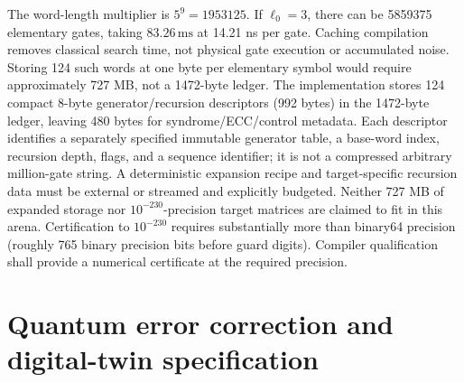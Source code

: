 \documentclass[11pt,a4paper]{article}
\newcommand{\unit}[1]{\,\mathrm{#1}}
\begin{document}
The word-length multiplier is $5^9=1953125$. If $\ell_0=3$, there can be 5859375 elementary
gates, taking $83.26\unit{ms}$ at 14.21 ns per gate. Caching compilation removes classical
search time, not physical gate execution or accumulated noise. Storing 124 such words at
one byte per elementary symbol would require approximately 727 MB, not a 1472-byte ledger.
The implementation stores 124 compact 8-byte generator/recursion descriptors
(992 bytes) in the 1472-byte ledger, leaving 480 bytes for syndrome/ECC/control metadata.
Each descriptor identifies a separately specified immutable generator table, a base-word
index, recursion depth, flags, and a sequence identifier; it is not a compressed arbitrary
million-gate string. A deterministic expansion recipe and target-specific recursion data
must be external or streamed and explicitly budgeted. Neither 727 MB of expanded storage
nor $10^{-230}$-precision target matrices are claimed to fit in this arena.
Certification to $10^{-230}$ requires substantially more than binary64 precision (roughly
765 binary precision bits before guard digits). Compiler qualification shall provide
a numerical certificate at the required precision.

\section{Quantum error correction and digital-twin specification}
\label{sec:twin}
\end{document}

